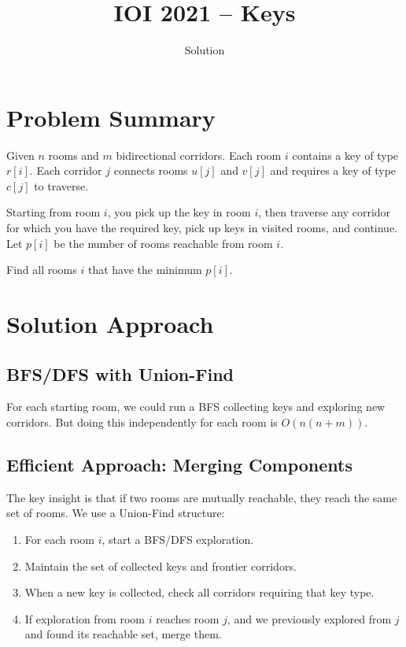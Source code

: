\documentclass[11pt,a4paper]{article}
\title{IOI 2021 -- Keys}
\author{Solution}
\date{}
\begin{document}
\maketitle

\section{Problem Summary}
Given $n$ rooms and $m$ bidirectional corridors. Each room $i$ contains a key of type $r[i]$. Each corridor $j$ connects rooms $u[j]$ and $v[j]$ and requires a key of type $c[j]$ to traverse.

Starting from room $i$, you pick up the key in room $i$, then traverse any corridor for which you have the required key, pick up keys in visited rooms, and continue. Let $p[i]$ be the number of rooms reachable from room $i$.

Find all rooms $i$ that have the minimum $p[i]$.

\section{Solution Approach}

\subsection{BFS/DFS with Union-Find}
For each starting room, we could run a BFS collecting keys and exploring new corridors. But doing this independently for each room is $O(n(n + m))$.

\subsection{Efficient Approach: Merging Components}
The key insight is that if two rooms are mutually reachable, they reach the same set of rooms. We use a Union-Find structure:

\begin{enumerate}
  \item For each room $i$, start a BFS/DFS exploration.
  \item Maintain the set of collected keys and frontier corridors.
  \item When a new key is collected, check all corridors requiring that key type.
  \item If exploration from room $i$ reaches room $j$, and we previously explored from $j$ and found its reachable set, merge them.
\end{enumerate}
\end{document}
